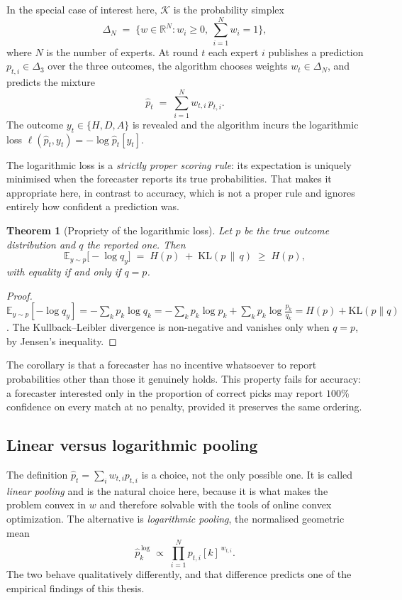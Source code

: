 \documentclass[12pt,a4paper,oneside]{report}
\renewcommand{\_}{\oldunderscore\allowbreak}
\theoremstyle{definition}
\theoremstyle{plain}
\newtheorem{theorem}{Theorem}[chapter]
\theoremstyle{remark}
\begin{document}
In the special case of interest here, $\mathcal{K}$ is the probability simplex
\[
\Delta_N \;=\; \Big\{ w \in \mathbb{R}^N : w_i \geq 0,\ \textstyle\sum_{i=1}^{N} w_i = 1 \Big\},
\]
where $N$ is the number of experts. At round $t$ each expert $i$ publishes a prediction
$p_{t,i} \in \Delta_3$ over the three outcomes, the algorithm chooses weights
$w_t \in \Delta_N$, and predicts the mixture
\[
\hat{p}_t \;=\; \sum_{i=1}^{N} w_{t,i}\, p_{t,i}.
\]
The outcome $y_t \in \{H,D,A\}$ is revealed and the algorithm incurs the logarithmic loss
$\ell(\hat{p}_t, y_t) = -\log \hat{p}_{t}[y_t]$.

The logarithmic loss is a \emph{strictly proper scoring rule}: its expectation is uniquely
minimised when the forecaster reports its true probabilities. That makes it appropriate here,
in contrast to accuracy, which is not a proper rule and ignores entirely how confident a
prediction was.

\begin{theorem}[Propriety of the logarithmic loss]
Let $p$ be the true outcome distribution and $q$ the reported one. Then
\[
\mathbb{E}_{y\sim p}\big[-\log q_y\big] \;=\; H(p) \;+\; \mathrm{KL}(p \,\|\, q) \;\geq\; H(p),
\]
with equality if and only if $q = p$.
\end{theorem}

\begin{proof}
$\mathbb{E}_{y\sim p}[-\log q_y] = -\sum_k p_k \log q_k
= -\sum_k p_k \log p_k + \sum_k p_k \log \frac{p_k}{q_k} = H(p) + \mathrm{KL}(p\|q)$.
The Kullback--Leibler divergence is non-negative and vanishes only when $q=p$, by Jensen's
inequality.
\end{proof}

The corollary is that a forecaster has no incentive whatsoever to report probabilities other
than those it genuinely holds. This property fails for accuracy: a forecaster interested only
in the proportion of correct picks may report $100\%$ confidence on every match at no penalty,
provided it preserves the same ordering.

\subsection*{Linear versus logarithmic pooling}
\label{sec:pooling}

The definition $\hat{p}_t = \sum_i w_{t,i} p_{t,i}$ is a choice, not the only possible one. It
is called \emph{linear pooling} and is the natural choice here, because it is what makes the
problem convex in $w$ and therefore solvable with the tools of online convex optimization. The
alternative is \emph{logarithmic pooling}, the normalised geometric mean
\[
\hat{p}^{\,\mathrm{log}}_k \;\propto\; \prod_{i=1}^{N} p_{t,i}[k]^{\,w_{t,i}} .
\]
The two behave qualitatively differently, and that difference predicts one of the empirical
findings of this thesis.
\end{document}
